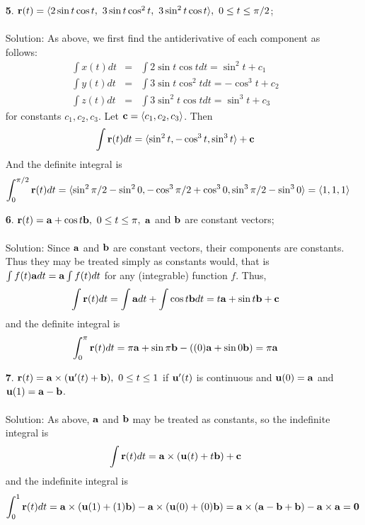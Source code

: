 \documentclass[12pt]{amsbook}
\newcommand{\la}{\langle}
\newcommand{\ra}{\rangle}
\begin{document}
\begin{enumerate}
  \item[{\small\bf 5}.] ${\bf r}(t)=\la 2\sin t\cos t,\ 3\sin t \cos^2 t,\ 3\sin^2 t\cos t\ra, \ 0 \leq t \leq \pi/2$;
  \\
  \\
  {\sc Solution}: As above, we first find the antiderivative of each component as follows:
  \begin{eqnarray*}
  \int x(t)dt&=&\int 2\sin t\cos tdt=\sin^2 t +c_1 \\
  \int y(t)dt&=&\int 3\sin t\cos^2 t dt = -\cos^3 t+c_2\\
  \int z(t)dt&=&\int 3\sin^2 t\cos t dt = \sin^3 t+c_3 
  \end{eqnarray*}
  for constants $c_1,c_2,c_3$. Let ${\bf c}=\la c_1,c_2,c_3\ra$. Then 
  $$\int {\bf r}(t)dt=\la \sin^2 t, -\cos^3 t, \sin^3 t \ra + {\bf c}$$
  And the definite integral is
$$\int_0^{\pi/2} {\bf r}(t)dt=\la \sin^2 \pi/2 - \sin^2 0, -\cos^3 \pi/2 + \cos^3 0, \sin^3 \pi/2 - \sin^3 0 \ra = \la 1, 1 , 1\ra$$
  \item[{\small\bf 6}.] ${\bf r}(t)={\bf a}+\cos t{\bf b}, \ 0 \leq t \leq \pi,$ ${\bf a}$ and ${\bf b}$ are constant vectors;
  \\
  \\
  {\sc Solution}: Since ${\bf a}$ and ${\bf b}$ are constant vectors, their components are constants. Thus they may be treated simply as constants would, that is $\int f(t){\bf a}dt={\bf a}\int f(t)dt$ for any (integrable) function $f$.  Thus,
  $$\int {\bf r}(t)dt=\int {\bf a}dt +\int \cos t {\bf b}dt = t{\bf a}+\sin t{\bf b}+{\bf c}$$
  and the definite integral is
  $$\int_0^\pi {\bf r}(t)dt=\pi{\bf a}+\sin \pi{\bf b}-((0){\bf a}+\sin 0{\bf b})=\pi{\bf a}$$
  \item[{\small\bf 7}.] ${\bf r}(t)={\bf a}\times({\bf u}'(t)+{\bf b}), \ 0 \leq t \leq 1$ if ${\bf u}'(t)$ is continuous and ${\bf u}(0)={\bf a}$ and ${\bf u}(1)={\bf a}-{\bf b}$.
  \\
  \\
  {\sc Solution}: As above, ${\bf a}$ and ${\bf b}$ may be treated as constants, so the indefinite integral is
  $$\int {\bf r}(t)dt={\bf a}\times({\bf u}(t)+t{\bf b})+{\bf c}$$
  and the indefinite integral is
  $$\int_0^1 {\bf r}(t)dt={\bf a}\times({\bf u}(1)+(1){\bf b})-{\bf a}\times({\bf u}(0)+(0){\bf b})={\bf a}\times({\bf a}-{\bf b}+{\bf b})-{\bf a}\times{\bf a}={\bf 0}$$
\end{enumerate}
\end{document}
